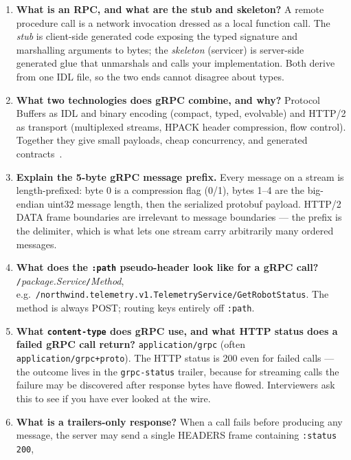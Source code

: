 \begin{enumerate}[label=\textbf{Q\arabic*.}, leftmargin=1.5cm]
  \item \textbf{What is an RPC, and what are the stub and skeleton?}
        A remote procedure call is a network invocation dressed as a local
        function call. The \emph{stub} is client-side generated code exposing
        the typed signature and marshalling arguments to bytes; the
        \emph{skeleton} (servicer) is server-side generated glue that
        unmarshals and calls your implementation. Both derive from one IDL
        file, so the two ends cannot disagree about types.
  \item \textbf{What two technologies does gRPC combine, and why?}
        Protocol Buffers as IDL and binary encoding (compact, typed,
        evolvable) and HTTP/2 as transport (multiplexed streams, HPACK header
        compression, flow control). Together they give small payloads, cheap
        concurrency, and generated contracts~\cite{grpcdocs,protobufdocs}.
  \item \textbf{Explain the 5-byte gRPC message prefix.}
        Every message on a stream is length-prefixed: byte 0 is a compression
        flag (0/1), bytes 1--4 are the big-endian uint32 message length, then
        the serialized protobuf payload. HTTP/2 DATA frame boundaries are
        irrelevant to message boundaries --- the prefix is the delimiter, which
        is what lets one stream carry arbitrarily many ordered messages.
  \item \textbf{What does the \texttt{:path} pseudo-header look like for a
        gRPC call?}
        \texttt{/}\emph{package.Service}\texttt{/}\emph{Method}, e.g.\
        \texttt{/northwind.telemetry.v1.TelemetryService/GetRobotStatus}. The
        method is always POST; routing keys entirely off \texttt{:path}.
  \item \textbf{What \texttt{content-type} does gRPC use, and what HTTP status
        does a failed gRPC call return?}
        \texttt{application/grpc} (often \texttt{application/grpc+proto}). The
        HTTP status is 200 even for failed calls --- the outcome lives in the
        \texttt{grpc-status} trailer, because for streaming calls the failure
        may be discovered after response bytes have flowed. Interviewers ask
        this to see if you have ever looked at the wire.
  \item \textbf{What is a trailers-only response?}
        When a call fails before producing any message, the server may send a
        single HEADERS frame containing \texttt{:status 200},

\end{enumerate}
